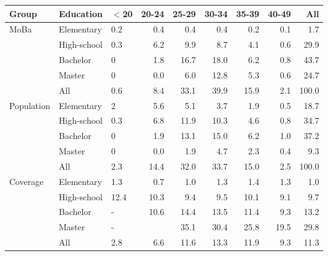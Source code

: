 \centering
\begin{tabular}{lllrrrrrr}
  \hline
Group & Education & $<$20 & 20-24 & 25-29 & 30-34 & 35-39 & 40-49 & All \\ 
  \hline
MoBa & Elementary & 0.2 & 0.4 & 0.4 & 0.4 & 0.2 & 0.1 & 1.7 \\ 
   & High-school & 0.3 & 6.2 & 9.9 & 8.7 & 4.1 & 0.6 & 29.9 \\ 
   & Bachelor & 0 & 1.8 & 16.7 & 18.0 & 6.2 & 0.8 & 43.7 \\ 
   & Master & 0 & 0.0 & 6.0 & 12.8 & 5.3 & 0.6 & 24.7 \\ 
   & All & 0.6 & 8.4 & 33.1 & 39.9 & 15.9 & 2.1 & 100.0 \\ 
  Population & Elementary & 2 & 5.6 & 5.1 & 3.7 & 1.9 & 0.5 & 18.7 \\ 
   & High-school & 0.3 & 6.8 & 11.9 & 10.3 & 4.6 & 0.8 & 34.7 \\ 
   & Bachelor & 0 & 1.9 & 13.1 & 15.0 & 6.2 & 1.0 & 37.2 \\ 
   & Master & 0 & 0.0 & 1.9 & 4.7 & 2.3 & 0.4 & 9.3 \\ 
   & All & 2.3 & 14.4 & 32.0 & 33.7 & 15.0 & 2.5 & 100.0 \\ 
  Coverage & Elementary & 1.3 & 0.7 & 1.0 & 1.3 & 1.4 & 1.3 & 1.0 \\ 
   & High-school & 12.4 & 10.3 & 9.4 & 9.5 & 10.1 & 9.1 & 9.7 \\ 
   & Bachelor & - & 10.6 & 14.4 & 13.5 & 11.4 & 9.3 & 13.2 \\ 
   & Master & - &  & 35.1 & 30.4 & 25.8 & 19.5 & 29.8 \\ 
   & All & 2.8 & 6.6 & 11.6 & 13.3 & 11.9 & 9.3 & 11.3 \\ 
   \hline
\end{tabular}
